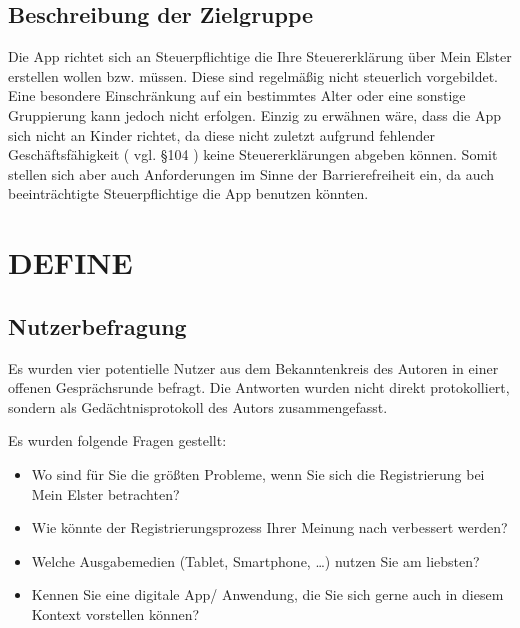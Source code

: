 \subsection{Beschreibung der Zielgruppe}\label{Beschreibung der Zielgruppe}
Die App richtet sich an Steuerpflichtige die Ihre Steuererklärung über \grq{}Mein Elster\grq{} erstellen wollen bzw. müssen.
Diese sind regelmäßig nicht steuerlich vorgebildet. Eine besondere Einschränkung auf ein bestimmtes Alter oder eine sonstige Gruppierung kann jedoch nicht erfolgen. Einzig zu erwähnen wäre, dass die App sich nicht an Kinder richtet, da diese nicht zuletzt aufgrund fehlender Geschäftsfähigkeit ( vgl. §104 \cite{bgb}) keine Steuererklärungen abgeben können. Somit stellen sich aber auch Anforderungen im Sinne der Barrierefreiheit ein, da auch beeinträchtigte Steuerpflichtige die App benutzen könnten.


\section{DEFINE}\label{DEFINE}


\subsection{Nutzerbefragung}%

Es wurden vier potentielle Nutzer aus dem Bekanntenkreis des Autoren in einer offenen Gesprächsrunde befragt. Die Antworten wurden nicht direkt protokolliert, sondern als Gedächtnisprotokoll des Autors zusammengefasst.

Es wurden folgende Fragen gestellt:
\begin{itemize}
\item Wo sind für Sie die größten Probleme, wenn Sie sich die Registrierung bei Mein Elster betrachten?

\item Wie könnte der Registrierungsprozess Ihrer Meinung nach verbessert werden?

\item Welche Ausgabemedien (Tablet, Smartphone, …) nutzen Sie am liebsten?

\item Kennen Sie eine digitale App/ Anwendung, die Sie sich gerne auch in diesem Kontext vorstellen können?

\end{itemize}


